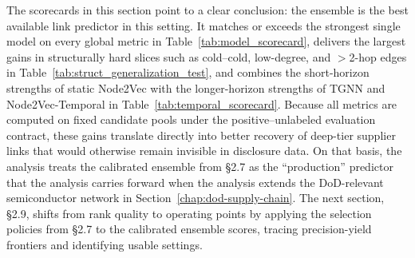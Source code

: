 \begin{table}[tbp]
  \centering
  \caption[\textit{Temporal Scorecard}]{\textit{Temporal Scorecard}}
  \label{tab:temporal_scorecard}

  \resizebox{\linewidth}{!}{}

  \captionsetup{justification=raggedright,singlelinecheck=false}
  \caption*{\footnotesize \textit{Note}. Short horizons (0--6\,m, 6--12\,m) are evaluated on the \textit{validation} window (calendar-anchored from $T_0$ end), while long horizons (36--48\,m, 48--60\,m) are evaluated on the \textit{test} window. When a calendar window straddles the split boundary, evaluation is restricted to its intersection with the designated split. Average Precision (AP) is computed under positive--unlabeled labeling within each horizon; entries are macro-averaged across eligible sources. \emph{Retention} is defined as $\mathrm{AP}_{48\text{--}60}\!/\mathrm{AP}_{0\text{--}6}$ (scale-free durability). Candidate pools use \emph{undirected two-hop} reachability with \emph{uniform} fallback to a per-source budget of 5{,}000 candidate-pool (seed = 42), excluding earlier positives (\textit{val}: exclude train; \textit{test}: exclude train $\cup$ val). Boldface best-in-class excludes the Ensemble. The Ensemble row is included for context; its validation AP of 1.000 reflects in-sample optimization and should not be compared directly with test-window values. Full horizon set and base rates per horizon are reported in Appendix~\ref{app:a4-temporal}.}
\end{table}

The scorecards in this section point to a clear conclusion: the ensemble is the best available link predictor in this setting. It matches or exceeds the strongest single model on every global metric in Table~\ref{tab:model_scorecard}, delivers the largest gains in structurally hard slices such as cold--cold, low-degree, and \(>\)2-hop edges in Table~\ref{tab:struct_generalization_test}, and combines the short-horizon strengths of static Node2Vec with the longer-horizon strengths of TGNN and Node2Vec-Temporal in Table~\ref{tab:temporal_scorecard}. Because all metrics are computed on fixed candidate pools under the positive--unlabeled evaluation contract, these gains translate directly into better recovery of deep-tier supplier links that would otherwise remain invisible in disclosure data. On that basis, the analysis treats the calibrated ensemble from \S2.7 as the ``production'' predictor that the analysis carries forward when the analysis extends the DoD-relevant semiconductor network in Section~\ref{chap:dod-supply-chain}. The next section, \S2.9, shifts from rank quality to operating points by applying the selection policies from \S2.7 to the calibrated ensemble scores, tracing precision-yield frontiers and identifying usable settings.

